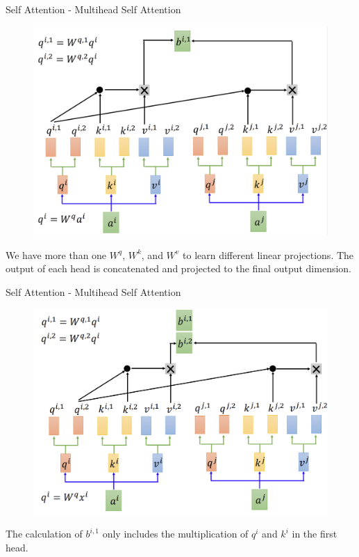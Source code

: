 \documentclass[aspectratio=169,xcolor=dvipsnames]{beamer}
\begin{document}

\begin{frame}{Self Attention - Multihead Self Attention}
    \begin{figure}
        \centering
        \includegraphics[width=0.6\linewidth]{figures/multihead_self_attention.png}
        \label{multihead_self_attention}
    \end{figure}
    We have more than one $W^q$, $W^k$, and $W^v$ to learn different linear projections. The output of each head is concatenated and projected to the final output dimension.
\end{frame}


\begin{frame}{Self Attention - Multihead Self Attention}
    \begin{figure}
        \centering
        \includegraphics[width=0.6\linewidth]{figures/multihead_self_attention_weights.png}
        \label{multihead_self_attention_weights}
    \end{figure}
    The calculation of $b^{i,1}$ only includes the multiplication of $q^i$ and $k^i$ in the first head.
\end{frame}

\end{document}
